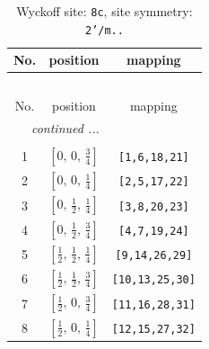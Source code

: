 \documentclass[fleqn,8pt]{jsarticle}
\begin{document}
\begin{longtable}{ccc}
\caption{Wyckoff site: {\tt 8c}, site symmetry: {\tt 2'/m..}}
 \\
 \hline \hline
No. & position & mapping \\ \hline \endfirsthead

\multicolumn{2}{l}{\tablename\ \thetable{}} \\
 \hline \hline
No. & position & mapping \\ \hline \endhead

 \hline \hline
\multicolumn{2}{r}{\footnotesize\it continued ...} \\ \endfoot

 \hline \hline
\multicolumn{2}{r}{} \\ \endlastfoot

1 & $\left[ 0,\, 0,\, \frac{3}{4} \right]$ & {\tt [1,6,18,21]} \\ \hline
2 & $\left[ 0,\, 0,\, \frac{1}{4} \right]$ & {\tt [2,5,17,22]} \\ \hline
3 & $\left[ 0,\, \frac{1}{2},\, \frac{1}{4} \right]$ & {\tt [3,8,20,23]} \\ \hline
4 & $\left[ 0,\, \frac{1}{2},\, \frac{3}{4} \right]$ & {\tt [4,7,19,24]} \\ \hline
5 & $\left[ \frac{1}{2},\, \frac{1}{2},\, \frac{1}{4} \right]$ & {\tt [9,14,26,29]} \\ \hline
6 & $\left[ \frac{1}{2},\, \frac{1}{2},\, \frac{3}{4} \right]$ & {\tt [10,13,25,30]} \\ \hline
7 & $\left[ \frac{1}{2},\, 0,\, \frac{3}{4} \right]$ & {\tt [11,16,28,31]} \\ \hline
8 & $\left[ \frac{1}{2},\, 0,\, \frac{1}{4} \right]$ & {\tt [12,15,27,32]} \\
\end{longtable}
\renewcommand{\arraystretch}{1.2}
\end{document}
